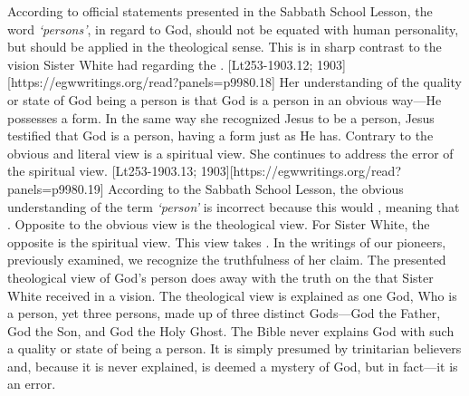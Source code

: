 According to official statements presented in the Sabbath School Lesson, the word \textit{‘persons’},\textit{ }in regard to God, should not be equated with human personality, but should be applied in the theological sense. This is in sharp contrast to the vision Sister White had regarding the . [Lt253-1903.12; 1903][https://egwwritings.org/read?panels=p9980.18] Her understanding of the quality or state of God being a person is that God is a person in an obvious way—He possesses a form. In the same way she recognized Jesus to be a person, Jesus testified that God is a person, having a form just as He has. Contrary to the obvious and literal view is a spiritual view. She continues to address the error of the spiritual view. [Lt253-1903.13; 1903][https://egwwritings.org/read?panels=p9980.19] According to the Sabbath School Lesson, the obvious understanding of the term \textit{‘person’ }is incorrect because this would , meaning that . Opposite to the obvious view is the theological view. For Sister White, the opposite is the spiritual view. This view takes . In the writings of our pioneers, previously examined, we recognize the truthfulness of her claim. The presented theological view of God’s person does away with the truth on the  that Sister White received in a vision. The theological view is explained as one God, Who is a person, yet three persons, made up of three distinct Gods—God the Father, God the Son, and God the Holy Ghost. The Bible never explains God with such a quality or state of being a person. It is simply presumed by trinitarian believers and, because it is never explained, is deemed a mystery of God, but in fact—it is an error.



